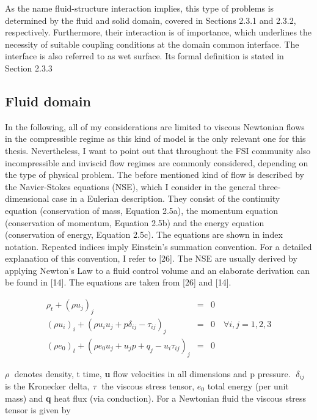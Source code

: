 As the name fluid-structure interaction implies, this type of problems is determined by the fluid and solid
domain, covered in Sections 2.3.1 and 2.3.2, respectively. Furthermore, their interaction is of importance,
which underlines the necessity of suitable coupling conditions at the domain common interface. The
interface is also referred to as wet surface. Its formal definition is stated in Section 2.3.3

\subsection{Fluid domain}

In the following, all of my considerations are limited to viscous Newtonian flows in the compressible
regime as this kind of model is the only relevant one for this thesis. Nevertheless, I want to point out that
throughout the FSI community also incompressible and inviscid flow regimes are commonly considered,
depending on the type of physical problem.
The before mentioned kind of flow is described by the Navier-Stokes equations (NSE), which I consider
in the general three-dimensional case in a Eulerian description. They consist of the continuity equation
(conservation of mass, Equation 2.5a), the momentum equation (conservation of momentum, Equation
2.5b) and the energy equation (conservation of energy, Equation 2.5c). The equations are shown in index
notation. Repeated indices imply Einstein’s summation convention. For a detailed explanation of this
convention, I refer to [26]. The NSE are usually derived by applying Newton’s Law to a fluid control
volume and an elaborate derivation can be found in [14]. The equations are taken from [26] and [14].

\begin{eqnarray}
	\rho_t + \left(\rho u_j\right)_j &=&  0 \\
	\left(\rho u_i\right)_i + \left(\rho u_i u_j +p\delta_{ij} -\tau_{ij}\right)_j &=& 0 \quad \forall i,j = 1,2,3 \\
	\left(\rho e_0\right)_t + \left(\rho e_0 u_j +u_jp + q_j -u_i \tau_{ij}\right)_j &=& 0
\end{eqnarray}


$\rho$ denotes density, t time, \textbf{u} flow velocities in all dimensions and p pressure. $\delta_{ij}$
is the Kronecker delta, $\tau$ the viscous stress tensor, $e_0$ total energy (per unit mass) and \textbf{q} heat flux (via conduction). For a Newtonian fluid the viscous stress tensor is given by

